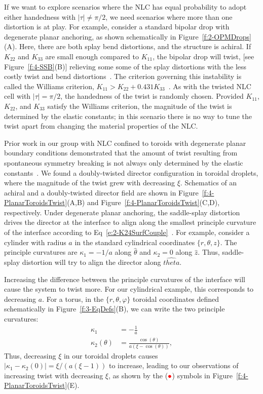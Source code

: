 If we want to explore scenarios where the NLC has equal probability to adopt either handedness with $|\tau| \neq \pi/2$, we need scenarios where more than one distortion is at play.
For example, consider a standard bipolar drop with degenerate planar anchoring, as shown schematically in Figure~\ref{f:2-OPMDrops}(A).
Here, there are both splay bend distortions, and the structure is achiral.
If $K_{22}$ and $K_{33}$ are small enough compared to $K_{11}$, the bipolar drop will twist, [see Figure~\ref{f:4-SSB}(B)] relieving some some of the splay distortions with the less costly twist and bend distortions~\cite{RN297,RN296,RN295}.
The criterion governing this instability is called the Williams criterion, $K_{11} > K_{22}+ 0.431 K_{33}$~\cite{RN297}.
As with the twisted NLC cell with $|\tau| = \pi/2$, the handedness of the twist is randomly chosen.
Provided $K_{11}$, $K_{22}$, and $K_{33}$ satisfy the Williams criterion, the magnitude of the twist is determined by the elastic constants; in this scenario there is no way to tune the twist apart from changing the material properties of the NLC.

Prior work in our group with NLC confined to toroids with degenerate planar boundary conditions demonstrated that the amount of twist resulting from spontaneous symmetry breaking is not always only determined by the elastic constants~\cite{RN24}.
We found a doubly-twisted director configuration in toroidal droplets, where the magnitude of the twist grew with decreasing $\xi$.
Schematics of an achiral and a doubly-twisted director field are shown in Figure~\ref{f:4-PlanarToroidsTwist}(A,B) and Figure~\ref{f:4-PlanarToroidsTwist}(C,D), respectively.
Under degenerate planar anchoring, the saddle-splay distortion drives the director at the interface to align along the smallest principle curvature of the interface according to Eq~\ref{e:2-K24SurfCouple}~\cite{RN59}.
For example, consider a cylinder with radius $a$ in the standard cylindrical coordinates $\{r, \theta, z \}$.
The principle curvatures are $\kappa_1 = -1/a$ along $\hat{\theta}$ and $\kappa_2 = 0$ along $\hat{z}$.
Thus, saddle-splay distortion will try to align the director along $\hat{theta}$.

Increasing the difference between the principle curvatures of the interface will cause the system to twist more.
For our cylindrical example, this corresponds to decreasing $a$.
For a torus, in the $\{r, \theta, \varphi\}$ toroidal coordinates defined schematically in Figure~\ref{f:3-EqDefs}(B), we can write the two principle curvatures:
\begin{align}
  \kappa_1 &= -\frac{1}{a} \\
  \kappa_2(\theta) &= \frac{\cos(\theta)}{a(\xi-\cos(\theta))},
\end{align}
Thus, decreasing $\xi$ in our toroidal droplets causes $|\kappa_1-\kappa_2(0)| = \xi/(a(\xi-1))$ to increase, leading to our observations of increasing twist with decreasing $\xi$, as shown by the (${\color{red} \bullet}$) symbols in Figure~\ref{f:4-PlanarToroidsTwist}(E).

